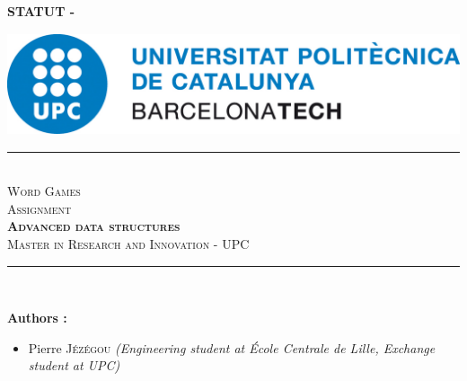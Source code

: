 \pagestyle{plain}
\pagecolor{white}

\begin{center}
    \color{red!50!white}
    \textbf{\huge{STATUT - \documentStatus}}
\end{center}

\vfill

\color{black}
\begin{center}
    \includegraphics[height=3cm]{images/logos/upc_logo.jpeg} \\
    \vfill

    \rule{\linewidth}{0.5mm} \\[1cm]
    {\Huge \textsc{\textcolor{fib_red}{Word Games}}}\\[1cm]
    {\Large \textsc{Assignment}}\\[0.4cm]
    {\huge \textsc{\textbf{Advanced data structures}}}\\[1cm]
    {\Large \textsc{Master in Research and Innovation - UPC}}\\[0.4cm]
    \rule{\linewidth}{0.5mm} \\[1.5cm]
\end{center}

\vfill

\textbf{Authors :}
\begin{itemize}
\item Pierre \textsc{Jézégou}\newline
\textit{(Engineering student at École Centrale de Lille, Exchange student at UPC)}
\end{itemize}

\vfill

\newpage
\color{black}
\pagecolor{white}
\pagestyle{fancy}